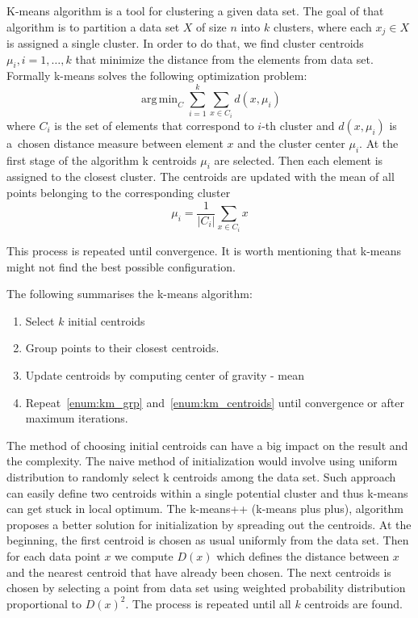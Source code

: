 \documentclass{article}
\DeclareMathOperator*{\argmin}{arg\,min} %
\begin{document}
K-means algorithm is a tool for clustering a given data set.
The goal of that algorithm is to partition a data set $X$ of size $n$ into $k$ clusters, where each $x_{j}\in X$ is assigned a single cluster. In order to do that, we find cluster centroids $\mu_{i}, i=1,\ldots,k$ that minimize the distance from the elements from data set. Formally k-means solves the following optimization problem:
\begin{equation}
  \argmin_{C}\sum_{i=1}^{k}\sum_{x\in C_{i}} d(x,\mu_{i})
\end{equation}
where $C_{i}$ is the set of elements that correspond to $i$-th cluster and $d(x,\mu_{i})$ is a~chosen distance measure between element $x$ and the cluster center $\mu_{i}$. At the first stage of the algorithm k centroids $\mu_{i}$ are selected. Then each element is assigned to the closest cluster. The centroids are updated with the mean of all points belonging to the corresponding cluster
\begin{equation}
  \mu_{i} = \frac{1}{|C_{i}|} \sum_{x\in C_{i}} x
\end{equation}

This process is repeated until convergence. It is worth mentioning that k-means might not find the best possible 
configuration.

The following summarises the k-means algorithm:

\begin{center}


\begin{enumerate}
	\item 
		Select $k$ initial centroids
	\item \label{enum:km_grp} 
		Group points to their closest centroids.
	\item \label{enum:km_centroids} 
		Update centroids by computing center of gravity - mean
	\item 
		Repeat~\ref{enum:km_grp} and~\ref{enum:km_centroids} until convergence or after maximum iterations.
\end{enumerate}

\end{center}

The method of choosing initial centroids can have a big impact on the result and the complexity. The naive method of initialization would involve using uniform distribution to randomly select k centroids among the data set. Such approach can easily define two centroids within a single potential cluster and thus k-means can get stuck in local optimum.
The k-means++ (k-means plus plus), algorithm proposes a better solution for initialization by spreading out the centroids. At the beginning, the first centroid is chosen as usual uniformly from the data set. Then for each data point $x$ we compute $D(x)$ which defines the distance between $x$ and the nearest centroid that have already been chosen. The next centroids is chosen by selecting a point from data set using weighted probability distribution proportional to $D(x)^2$. The process is repeated until all $k$ centroids are found.
\end{document}

